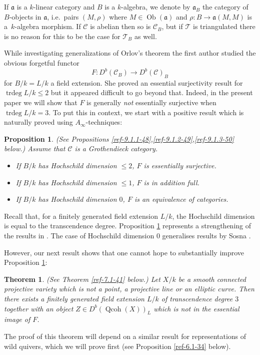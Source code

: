 \documentclass{amsart}
\numberwithin{equation}{section}
\let\cal\mathcal
\newtheorem{proposition}[lemma]{Proposition}
\newtheorem{theorem}[lemma]{Theorem}
\theoremstyle{definition}
\theoremstyle{remark}
\begin{document}
\medskip

 If $\mathfrak{a}$ is
a $k$-linear category and $B$ is a $k$-algebra, we denote by $\mathfrak{a}_B$ the category of $B$-objects
in $\mathfrak{a}$, i.e.\ pairs $(M,\rho)$ where $M\in {\operatorname{Ob}}(\mathfrak{a})$ and $\rho:B{\rightarrow} \mathfrak{a}(M,M)$
is a~$k$-algebra morphism. 
If ${{\cal C}}$ is abelian then so is ${{\cal C}}_B$, but if ${{\cal T}}$ is triangulated
there is no reason for this to be the case for ${{\cal T}}_B$ as well.

While investigating generalizations of Orlov's theorem \cite{Rizzardo}
the first
author studied the obvious forgetful functor
\[
F:D^b({{\cal C}}_B){\rightarrow} D^b({{\cal C}})_B
\]
for $B/k=L/k$ a field extension. She proved an essential surjectivity result for ${\operatorname{trdeg}} L/k\le 2$ but it appeared difficult
to go beyond that. Indeed, in the present paper we will show that $F$ is generally \emph{not} essentially surjective when ${\operatorname{trdeg}} L/k=3$.
To put this in context, we start with a positive result which is naturally proved using $A_\infty$-techniques:
{

\begin{proposition} (See Propositions \ref{ref-9.1.1-48},\ref{ref-9.1.2-49},\ref{ref-9.1.3-50} below.)  Assume that ${{\cal C}}$ is a Grothendieck category. 
\label{ref-B-1}
\begin{itemize}
\item If $B/k$ has Hochschild dimension $\le 2$, $F$ is essentially surjective.
\item If $B/k$ has Hochschild dimension $\le 1$, $F$ is in addition full.
\item If $B/k$ has Hochschild dimension $0$, $F$ is an equivalence
of categories. 
\end{itemize}
\end{proposition}
}
Recall that, for a finitely generated field extension $L/k$, the Hochschild dimension is equal to the transcendence degree.
Proposition \ref{ref-B-1} represents a strengthening of the results in \cite{Keller21}.
The case of Hochschild dimension $0$ generalises results by Sosna \cite{Sosna}.

However, our next result shows that one cannot hope to substantially improve Proposition \ref{ref-B-1}:
{
\begin{theorem} (See Theorem \ref{ref-7.1-41} below.) 
\label{ref-C-2}
Let $X/k$ be a smooth connected projective variety which is not a point, a projective line or an elliptic curve. Then there exists a finitely generated field extension $L/k$
  of transcendence degree $3$ together with an object $Z\in D^b({\operatorname{Qcoh}}(X))_L$ which is not
in the essential image of $F$.
\end{theorem}
}
The proof
of this theorem will depend on a similar  result for representations of wild quivers, which we will prove first (see Proposition \ref{ref-6.1-34} below). 
\end{document}

